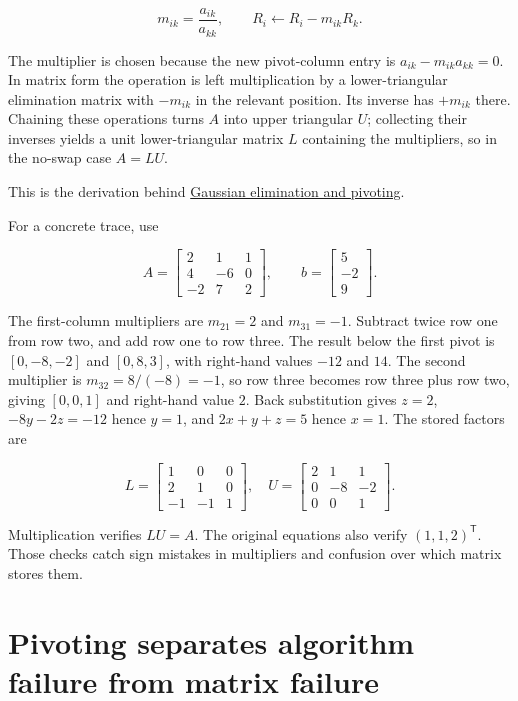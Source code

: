 \[
m_{ik}=\frac{a_{ik}}{a_{kk}},\qquad R_i\leftarrow R_i-m_{ik}R_k.
\]

The multiplier is chosen because the new pivot-column entry is \(a_{ik}-m_{ik}a_{kk}=0\). In matrix form the operation is left multiplication by a lower-triangular elimination matrix with \(-m_{ik}\) in the relevant position. Its inverse has \(+m_{ik}\) there. Chaining these operations turns \(A\) into upper triangular \(U\); collecting their inverses yields a unit lower-triangular matrix \(L\) containing the multipliers, so in the no-swap case \(A=LU\).

This is the derivation behind \hyperref[01-foundations-i-ch019-elimination-turns-the-geometry-into-an-auditable-calculation]{Gaussian elimination and pivoting}.

For a concrete trace, use

\[
A=\begin{bmatrix}2&1&1\\4&-6&0\\-2&7&2\end{bmatrix},\qquad
b=\begin{bmatrix}5\\-2\\9\end{bmatrix}.
\]

The first-column multipliers are \(m_{21}=2\) and \(m_{31}=-1\). Subtract twice row one from row two, and add row one to row three. The result below the first pivot is \([0,-8,-2]\) and \([0,8,3]\), with right-hand values \(-12\) and \(14\). The second multiplier is \(m_{32}=8/(-8)=-1\), so row three becomes row three plus row two, giving \([0,0,1]\) and right-hand value \(2\). Back substitution gives \(z=2\), \(-8y-2z=-12\) hence \(y=1\), and \(2x+y+z=5\) hence \(x=1\). The stored factors are

\[
L=\begin{bmatrix}1&0&0\\2&1&0\\-1&-1&1\end{bmatrix},\quad
U=\begin{bmatrix}2&1&1\\0&-8&-2\\0&0&1\end{bmatrix}.
\]

Multiplication verifies \(LU=A\). The original equations also verify \((1,1,2)^\mathsf T\). Those checks catch sign mistakes in multipliers and confusion over which matrix stores them.

\section{Pivoting separates algorithm failure from matrix failure}\label{01-foundations-i-ch019-pivoting-separates-algorithm-failure-from-matrix-failure}

